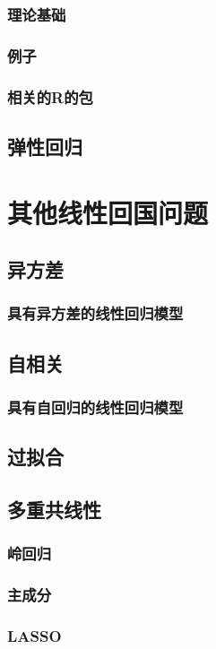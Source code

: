 \documentclass{amsart}
\begin{document}
\subsubsection{理论基础}
\subsubsection{例子}
\subsubsection{相关的R的包}

\subsection{弹性回归}

\section{其他线性回国问题}

\subsection{异方差}
\subsubsection{具有异方差的线性回归模型}
\subsection{自相关}
\subsubsection{具有自回归的线性回归模型}


\subsection{过拟合}
\subsection{多重共线性}
\subsubsection{岭回归}
\subsubsection{主成分}
\subsubsection{LASSO}
\end{document}
